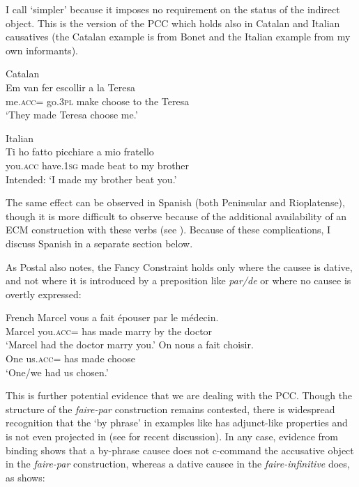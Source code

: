 \documentclass[output=paper,colorlinks,citecolor=brown,nonflat]{./langscibook}
\begin{document}
I call  ‘simpler’ because it imposes no requirement on the status of the indirect object. This is the version of the PCC which holds also in Catalan and Italian causatives (the Catalan example is from Bonet and the Italian example from my own informants). 

\ea%
    \label{ex:sheehan:17}
    Catalan \citep[195]{Bonet1991}\\
    \gll   *Em       van     fer     escollir   a   la   Teresa\\
            me.\textsc{acc}=  go.\textsc{3pl}   make   choose   to   the   Teresa\\
    \glt ‘They made Teresa choose me.’
\z

\ea%
    \label{ex:sheehan:18}
    Italian\\
    \gll   *Ti     ho     fatto   picchiare     a   mio   fratello\\
         you.\textsc{acc}  have.\textsc{1sg}   made beat         to   my   brother\\
    \glt    Intended: ‘I made my brother beat you.’
\z

The same effect can be observed in Spanish (both Peninsular and Rioplatense), though it is more difficult to observe because of the additional availability of an ECM construction with these verbs (see \citealt{Strozer1976, Torrego2010}). Because of these complications, I discuss Spanish in a separate section below.  

As Postal also notes, the Fancy Constraint holds only where the causee is dative, and not where it is introduced by a preposition like \textit{par/de} or where no causee is overtly expressed:

\ea%
    \label{ex:sheehan:19}
    French \citep[3]{Postal1989}
    \ea\label{ex:sheehan:19a}
    \gll    Marcel vous     a  fait   épouser   par   le   médecin.\\
            Marcel you.\textsc{acc}=  has  made   marry   by   the   doctor\\
    \glt ‘Marcel had the doctor marry you.’
    \ex\label{ex:sheehan:19b}
    \gll   On  nous     a   fait choisir.\\
            One   us.\textsc{acc}=  has   made choose\\
    \glt    ‘One/we had us chosen.’
    \z
\z

This is further potential evidence that we are dealing with the PCC. Though the structure of the \textit{faire-par} construction remains contested, there is widespread recognition that the ‘by phrase’ in examples like  has adjunct-like properties and is not even projected in  (see \citealt{Guasti1996, FolliHarley2007, SheehanCyrino2016} for recent discussion). In any case, evidence from binding shows that a by-phrase causee does not c-command the accusative object in the \textit{faire-par} construction, whereas a dative causee in the \textit{faire-infinitive} does, as \citet{Burzio1986} shows:
\end{document}
